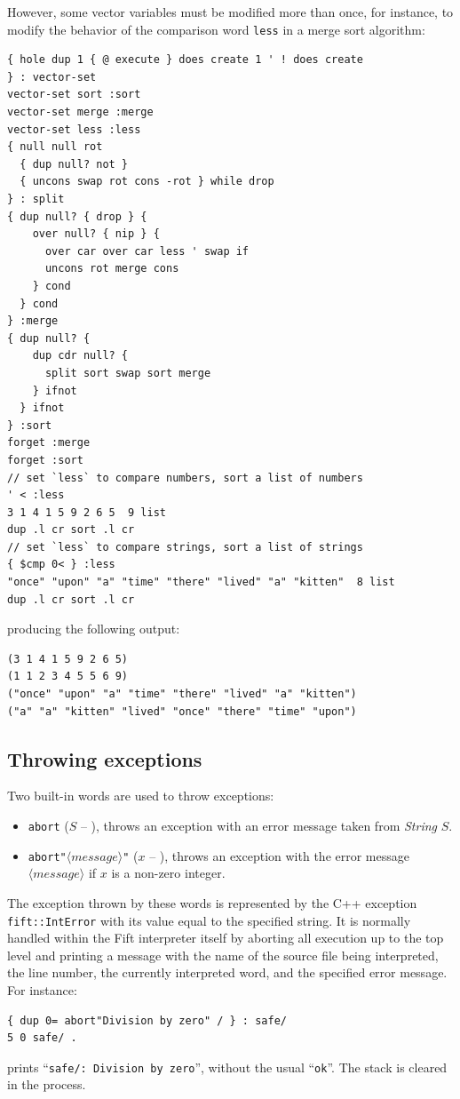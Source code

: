 \documentclass[12pt,oneside]{article}
\def\mysubsection#1{\subsection{#1}\fancyhead[C]{\small{\textsc{\textrm{\thesubsection.} #1}}}}
\begin{document}
However, some vector variables must be modified more than once, for instance, to modify the behavior of the comparison word {\tt less} in a merge sort algorithm:
\begin{verbatim}
{ hole dup 1 { @ execute } does create 1 ' ! does create
} : vector-set
vector-set sort :sort
vector-set merge :merge
vector-set less :less
{ null null rot
  { dup null? not }
  { uncons swap rot cons -rot } while drop
} : split
{ dup null? { drop } {
    over null? { nip } {
      over car over car less ' swap if
      uncons rot merge cons
    } cond
  } cond
} :merge
{ dup null? {
    dup cdr null? {
      split sort swap sort merge
    } ifnot
  } ifnot
} :sort
forget :merge
forget :sort
// set `less` to compare numbers, sort a list of numbers
' < :less
3 1 4 1 5 9 2 6 5  9 list
dup .l cr sort .l cr
// set `less` to compare strings, sort a list of strings
{ $cmp 0< } :less
"once" "upon" "a" "time" "there" "lived" "a" "kitten"  8 list
dup .l cr sort .l cr
\end{verbatim}
producing the following output:
\begin{verbatim}
(3 1 4 1 5 9 2 6 5)
(1 1 2 3 4 5 5 6 9)
("once" "upon" "a" "time" "there" "lived" "a" "kitten")
("a" "a" "kitten" "lived" "once" "there" "time" "upon")
\end{verbatim}

\mysubsection{Throwing exceptions}\label{p:exception.ops}
Two built-in words are used to throw exceptions:
\begin{itemize}
\item {\tt abort} ($S$ -- ), throws an exception with an error message taken from {\em String\/} $S$.
\item {\tt abort"$\langle\textit{message}\rangle$"} ($x$ -- ), throws an exception with the error message $\langle\textit{message}\rangle$ if $x$ is a non-zero integer.
\end{itemize}
The exception thrown by these words is represented by the C++ exception {\tt fift::IntError} with its value equal to the specified string. It is normally handled within the Fift interpreter itself by aborting all execution up to the top level and printing a message with the name of the source file being interpreted, the line number, the currently interpreted word, and the specified error message. For instance:
\begin{verbatim}
{ dup 0= abort"Division by zero" / } : safe/
5 0 safe/ .
\end{verbatim}
prints ``{\tt safe/: Division by zero}'', without the usual ``{\tt ok}''. The stack is cleared in the process.
\end{document}
